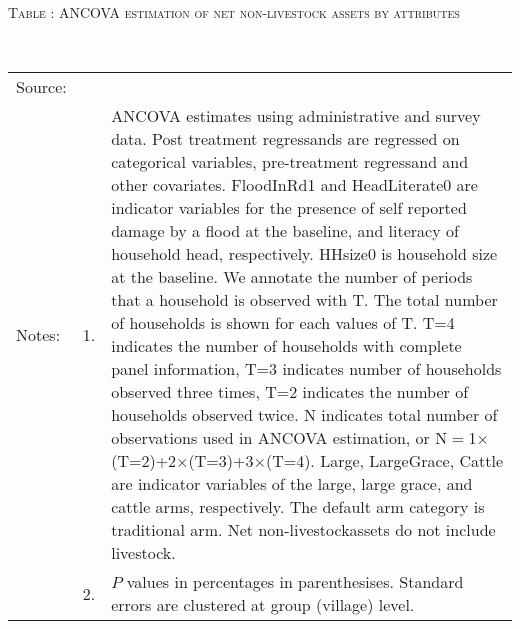 \hspace{-1cm}\begin{minipage}[t]{14cm}
\hfil\textsc{\normalsize Table \thetable: ANCOVA estimation of net non-livestock assets by attributes\label{tab ANCOVA NetNLAssets attributes}}\\
\setlength{\tabcolsep}{1pt}
\setlength{\baselineskip}{8pt}
\renewcommand{\arraystretch}{.55}
\hfil{}\\
\renewcommand{\arraystretch}{.8}
\setlength{\tabcolsep}{1pt}
\begin{tabular}{>{\hfill\scriptsize}p{1cm}<{}>{\hfill\scriptsize}p{.25cm}<{}>{\scriptsize}p{12cm}<{\hfill}}
Source:& \multicolumn{2}{l}{\scriptsize Estimated with GUK administrative and survey data.}\\
Notes: & 1. & ANCOVA estimates using administrative and survey data. Post treatment regressands are regressed on categorical variables, pre-treatment regressand and other covariates. \textsf{FloodInRd1} and \textsf{HeadLiterate0} are indicator variables for the presence of self reported damage by a flood at the baseline, and literacy of household head, respectively. \textsf{HHsize0} is household size at the baseline. We annotate the number of periods that a household is observed with \textsf{T}. The total number of households is shown for each values of \textsf{T}. \textsf{T=4} indicates the number of households with complete panel information, \textsf{T=3} indicates number of households observed three times, \textsf{T=2} indicates the number of households observed twice. \textsf{N} indicates total number of observations used in ANCOVA estimation, or \textsf{N$=$1$\times$(T=2)+2$\times$(T=3)+3$\times$(T=4)}.  \textsf{Large}, \textsf{LargeGrace}, \textsf{Cattle} are indicator variables of the \textsf{large}, \textsf{large grace}, and \textsf{cattle} arms, respectively. The default arm category is \textsf{traditional} arm. Net non-livestockassets do not include livestock. \\
& 2. & $P$ values in percentages in parenthesises. Standard errors are clustered at group (village) level.
\end{tabular}
\end{minipage}

